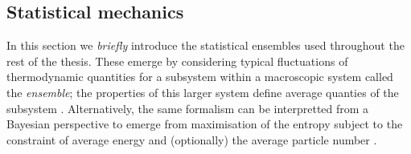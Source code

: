 \subsection{Statistical mechanics}

In this section we \emph{briefly} introduce the statistical ensembles used throughout the rest of the thesis.
These emerge by considering typical fluctuations of thermodynamic quantities for a subsystem within a macroscopic system called the \emph{ensemble}; the properties of this larger system define average quanties of the subsystem \cite{Landau2008}.
Alternatively, the same formalism can be interpretted from a Bayesian perspective to emerge from maximisation of the entropy%
subject to the constraint of average energy and (optionally) the average particle number \cite{JaynesPR1957,JaynesPR1957a}.

